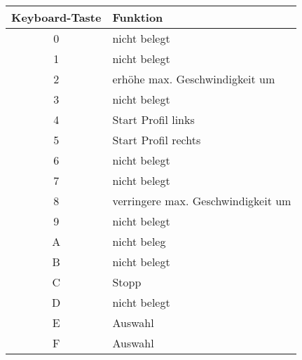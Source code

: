 \documentclass[.\jobname.tex]{subfiles}
\begin{document}
\begin{table}[h]
	\centering
	\begin{tabular}{ c l } 
		\toprule
		\textbf{Keyboard-Taste} & \textbf{Funktion} \\\toprule
		0 & nicht belegt\\\hline
		1 & nicht belegt\\\hline
		2 & erhöhe max. Geschwindigkeit um \stepSizeMotor\\\hline
		3 & nicht belegt\\\hline
		4 & Start Profil links\\\hline
		5 & Start Profil rechts\\\hline
		6 & nicht belegt\\\hline
		7 & nicht belegt\\\hline
		8 & verringere max. Geschwindigkeit um \stepSizeMotor\\\hline
		9 & nicht belegt\\\hline
		A & nicht beleg\\\hline
		B & nicht belegt\\\hline
		C & Stopp\\\hline
		D & nicht belegt\\\hline
		E & Auswahl \modeB \\\hline
		F & Auswahl \modeA \\\hline
	\end{tabular}
	\label{fig: funktionen tastenfeld}
\end{table}
%
\end{document}
